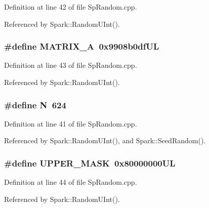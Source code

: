 Definition at line 42 of file Sp\-Random.cpp.

Referenced by Spark::Random\-UInt().
\subsubsection{\setlength{\rightskip}{0pt plus 5cm}\#define MATRIX\_\-A\ 0x9908b0df\-UL}\label{SpRandom_8cpp_a2}


Definition at line 43 of file Sp\-Random.cpp.

Referenced by Spark::Random\-UInt().
\subsubsection{\setlength{\rightskip}{0pt plus 5cm}\#define N\ 624}\label{SpRandom_8cpp_a0}


Definition at line 41 of file Sp\-Random.cpp.

Referenced by Spark::Random\-UInt(), and Spark::Seed\-Random().
\subsubsection{\setlength{\rightskip}{0pt plus 5cm}\#define UPPER\_\-MASK\ 0x80000000UL}\label{SpRandom_8cpp_a3}


Definition at line 44 of file Sp\-Random.cpp.

Referenced by Spark::Random\-UInt().